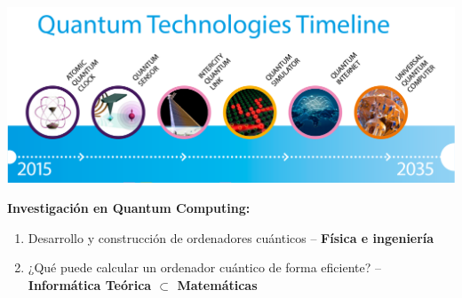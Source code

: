 \documentclass[11pt,compress]{beamer}
\begin{document}
\begin{frame}
  \begin{center}
    \includegraphics[width=\textwidth]{./images/quantum-prediction.png}
  \end{center}
  
  \begin{tcolorbox}[colback=ChetwodeBlue!10,colframe=ChetwodeBlue!60]
    \textbf{Investigación en Quantum Computing:}
    \begin{enumerate}
    \item Desarrollo y construcción de ordenadores cuánticos -- {\color{TurkishRose}\textbf{Física e ingeniería} \faWarning}
    \item ¿Qué puede calcular un ordenador cuántico de forma eficiente? -- {\color{TurkishRose}\textbf{Informática Teórica $\subset$ Matemáticas} \faHeart}
    \end{enumerate}
  \end{tcolorbox}

\end{frame}
\end{document}
